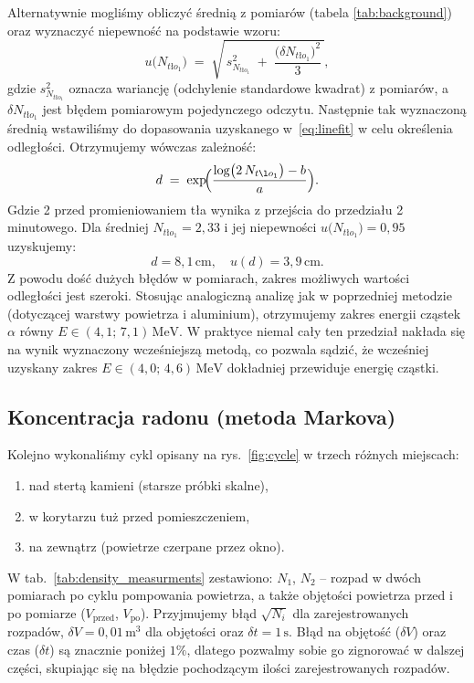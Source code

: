 \documentclass[12pt]{article}
\begin{document}
Alternatywnie mogliśmy obliczyć średnią z pomiarów (tabela \ref{tab:background}) oraz wyznaczyć niepewność na podstawie wzoru:
\[
	u\bigl(N_{tło_1}\bigr) \;=\; \sqrt{\,s^2_{N_{tło_1}} \;+\; \frac{\bigl(\delta N_{tło_1}\bigr)^2}{3}\,},
\]
gdzie \(s_{N_{tło_1}}^2\) oznacza wariancję (odchylenie standardowe kwadrat) z pomiarów, a \(\delta N_{tło_1}\) jest błędem pomiarowym pojedynczego odczytu. Następnie tak wyznaczoną średnią wstawiliśmy do dopasowania uzyskanego w~\eqref{eq:linefit} w celu określenia odległości. Otrzymujemy wówczas zależność:
\[
	d \;=\; \exp\!\Bigl(\frac{\log\bigl(2\,N_{tło_1} \bigr) - b}{a}\Bigr).
\]
Gdzie 2 przed promieniowaniem tła wynika z przejścia do przedziału 2 minutowego. Dla średniej \(N_{tło_1} = 2{,}33\) i jej niepewności \(u\bigl(N_{tło_1}\bigr) = 0{,}95\) uzyskujemy:
\[
	d = 8{,}1 \, \mathrm{cm},
	\quad
	u(d) = 3{,}9 \, \mathrm{cm}.
\]
Z powodu dość dużych błędów w pomiarach, zakres możliwych wartości odległości jest szeroki. Stosując analogiczną analizę jak w poprzedniej metodzie (dotyczącej warstwy powietrza i aluminium), otrzymujemy zakres energii cząstek \(\alpha\) równy \(E \in (4{,}1;\,7{,}1)\,\mathrm{MeV}\). W praktyce niemal cały ten przedział nakłada się na wynik wyznaczony wcześniejszą metodą, co pozwala sądzić, że wcześniej uzyskany zakres \(E \in (4{,}0;\,4{,}6)\,\mathrm{MeV}\) dokładniej przewiduje energię cząstki.

\subsection{Koncentracja radonu (metoda Markova)}
Kolejno wykonaliśmy cykl opisany na rys.~\ref{fig:cycle} w trzech różnych miejscach:
\begin{enumerate}[noitemsep]
	\item nad stertą kamieni (starsze próbki skalne),
	\item w korytarzu tuż przed pomieszczeniem,
	\item na zewnątrz (powietrze czerpane przez okno).
\end{enumerate}

W tab.~\ref{tab:density_measurments} zestawiono: $N_1$, $N_2$ – rozpad w dwóch pomiarach po cyklu pompowania powietrza, a także objętości powietrza przed i po pomiarze (\(V_{\text{przed}}\), \(V_{\text{po}}\)). Przyjmujemy błąd \(\sqrt{N_i}\) dla zarejestrowanych rozpadów, \(\delta V=0{,}01\,\mathrm{m^3}\) dla objętości oraz \(\delta t = 1 \, \mathrm{s}\).
Błąd na objętość (\(\delta V\)) oraz czas (\(\delta t\)) są znacznie poniżej \(1\%\), dlatego pozwalmy sobie go zignorować w dalszej części, skupiając się na błędzie pochodzącym ilości zarejestrowanych rozpadów.
\end{document}
